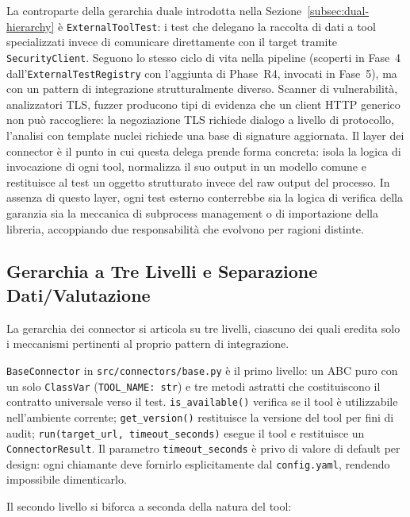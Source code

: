 La controparte della gerarchia duale introdotta nella Sezione~\ref{subsec:dual-hierarchy} è \texttt{ExternalToolTest}: i test che delegano la raccolta di dati a tool specializzati invece di comunicare direttamente con il target tramite \texttt{SecurityClient}. Seguono lo stesso ciclo di vita nella pipeline (scoperti in Fase~4 dall'\texttt{ExternalTestRegistry} con l'aggiunta di Phase~R4, invocati in Fase~5), ma con un pattern di integrazione strutturalmente diverso. Scanner di vulnerabilità, analizzatori \gls{TLS}, fuzzer producono tipi di evidenza che un client \gls{HTTP} generico non può raccogliere: la negoziazione \gls{TLS} richiede dialogo a livello di protocollo, l'analisi con template nuclei richiede una base di signature aggiornata. Il layer dei connector è il punto in cui questa delega prende forma concreta: isola la logica di invocazione di ogni tool, normalizza il suo output in un modello comune e restituisce al test un oggetto strutturato invece del raw output del processo. In assenza di questo layer, ogni test esterno conterrebbe sia la logica di verifica della garanzia sia la meccanica di subprocess management o di importazione della libreria, accoppiando due responsabilità che evolvono per ragioni distinte.


\subsection{Gerarchia a Tre Livelli e Separazione Dati/Valutazione}\label{subsec:connector-hierarchy}

La gerarchia dei connector si articola su tre livelli, ciascuno dei quali eredita solo i meccanismi pertinenti al proprio pattern di integrazione.

\texttt{BaseConnector} in \texttt{src/connectors/base.py} è il primo livello: un \gls{ABC} puro con un solo \texttt{ClassVar} (\texttt{TOOL\_NAME: str}) e tre metodi astratti che costituiscono il contratto universale verso il test. \texttt{is\_available()} verifica se il tool è utilizzabile nell'ambiente corrente; \texttt{get\_version()} restituisce la versione del tool per fini di audit; \texttt{run(target\_url, timeout\_seconds)} esegue il tool e restituisce un \texttt{ConnectorResult}. Il parametro \texttt{timeout\_seconds} è privo di valore di default per design: ogni chiamante deve fornirlo esplicitamente dal \texttt{config.yaml}, rendendo impossibile dimenticarlo.

Il secondo livello si biforca a seconda della natura del tool:

